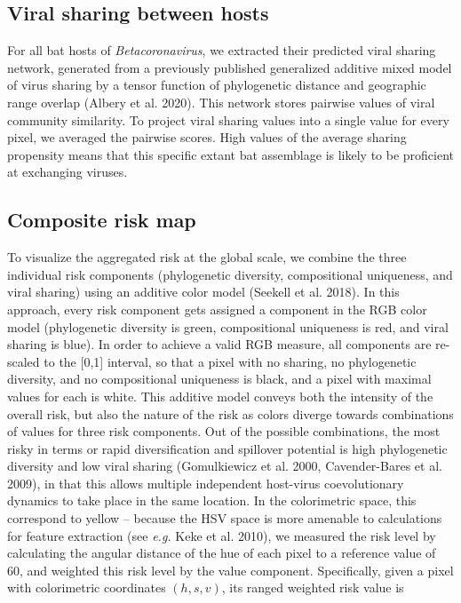 \documentclass[11pt]{article}
\begin{document}
\hypertarget{viral-sharing-between-hosts}{%
\subsection{Viral sharing between
hosts}\label{viral-sharing-between-hosts}}

For all bat hosts of \emph{Betacoronavirus}, we extracted their
predicted viral sharing network, generated from a previously published
generalized additive mixed model of virus sharing by a tensor function
of phylogenetic distance and geographic range overlap (Albery et al.
2020). This network stores pairwise values of viral community
similarity. To project viral sharing values into a single value for
every pixel, we averaged the pairwise scores. High values of the average
sharing propensity means that this specific extant bat assemblage is
likely to be proficient at exchanging viruses.

\hypertarget{composite-risk-map}{%
\subsection{Composite risk map}\label{composite-risk-map}}

To visualize the aggregated risk at the global scale, we combine the
three individual risk components (phylogenetic diversity, compositional
uniqueness, and viral sharing) using an additive color model (Seekell et
al. 2018). In this approach, every risk component gets assigned a
component in the RGB color model (phylogenetic diversity is green,
compositional uniqueness is red, and viral sharing is blue). In order to
achieve a valid RGB measure, all components are re-scaled to the
{[}0,1{]} interval, so that a pixel with no sharing, no phylogenetic
diversity, and no compositional uniqueness is black, and a pixel with
maximal values for each is white. This additive model conveys both the
intensity of the overall risk, but also the nature of the risk as colors
diverge towards combinations of values for three risk components. Out of
the possible combinations, the most risky in terms or rapid
diversification and spillover potential is high phylogenetic diversity
and low viral sharing (Gomulkiewicz et al. 2000, Cavender-Bares et al.
2009), in that this allows multiple independent host-virus
coevolutionary dynamics to take place in the same location. In the
colorimetric space, this correspond to yellow -- because the HSV space
is more amenable to calculations for feature extraction (see \emph{e.g.}
Keke et al. 2010), we measured the risk level by calculating the angular
distance of the hue of each pixel to a reference value of 60, and
weighted this risk level by the value component. Specifically, given a
pixel with colorimetric coordinates \((h,s,v)\), its ranged weighted
risk value is
\end{document}
